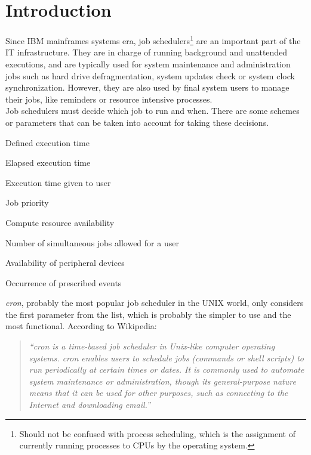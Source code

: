 \chapter{Introduction}
Since IBM mainframes systems era, job schedulers\footnote{Should not be confused with process scheduling, which is 
the assignment of currently running processes to CPUs by the operating system.} are an important part of the IT infrastructure.
They are in charge of running background and unattended executions, and are typically used for system maintenance and administration jobs 
such as hard drive defragmentation, system updates check or system clock synchronization. However, they are also used by final system 
users to manage their jobs, like reminders or resource intensive processes.\\
Job schedulers must decide which job to run and when. There are some schemes or parameters that can be taken into account for taking
these decisions\cite{wp:js}.\\
\begin{list}{-}{Some of the most used are:}
  \item Defined execution time
  \item Elapsed execution time
  \item Execution time given to user
  \item Job priority
  \item Compute resource availability
  \item Number of simultaneous jobs allowed for a user
  \item Availability of peripheral devices
  \item Occurrence of prescribed events
\end{list}
\emph{cron}, probably the most popular job scheduler in the UNIX world, only considers the first parameter from the list, which is 
probably the simpler to use and the most functional. According to Wikipedia\cite{wp:cron}:
\begin{quote}
  \emph{
    ``cron is a time-based job scheduler in Unix-like computer operating systems. cron 
    enables users to schedule jobs (commands or shell scripts) to run periodically at 
    certain times or dates. It is commonly used to automate system maintenance or 
    administration, though its general-purpose nature means that it can be used for other 
    purposes, such as connecting to the Internet and downloading email.''
  }
\end{quote}
